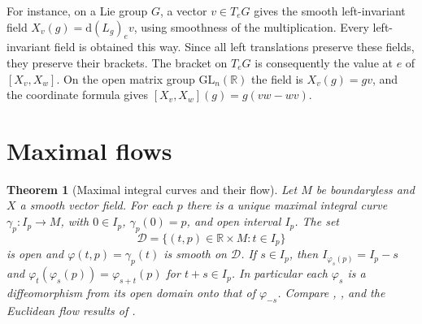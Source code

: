 \documentclass[11pt,oneside,openany]{book}
\newtheorem{theorem}{Theorem}[chapter]
\theoremstyle{definition}
\theoremstyle{remark}
\newcommand{\R}{\mathbb R}
\newcommand{\dd}{\mathrm d}
\begin{document}
For instance, on a Lie group \(G\), a vector \(v\in T_eG\) gives the smooth left-invariant field \(X_v(g)=\dd(L_g)_e v\), using smoothness of the multiplication. Every left-invariant field is obtained this way. Since all left translations preserve these fields, they preserve their brackets. The bracket on \(T_eG\) is consequently the value at \(e\) of \([X_v,X_w]\). On the open matrix group \(\mathrm{GL}_n(\R)\) the field is \(X_v(g)=gv\), and the coordinate formula gives \([X_v,X_w](g)=g(vw-wv)\).

\section{Maximal flows}

\begin{theorem}[Maximal integral curves and their flow]\label{p104:M06.03}
Let \(M\) be boundaryless and \(X\) a smooth vector field. For each \(p\) there is a unique maximal integral curve \(\gamma_p:I_p\to M\), with \(0\in I_p\), \(\gamma_p(0)=p\), and open interval \(I_p\). The set
\[
 \mathcal D=\{(t,p)\in\R\times M:t\in I_p\}
\]
is open and \(\varphi(t,p)=\gamma_p(t)\) is smooth on \(\mathcal D\). If \(s\in I_p\), then \(I_{\varphi_s(p)}=I_p-s\) and \(\varphi_t(\varphi_s(p))=\varphi_{s+t}(p)\) for \(t+s\in I_p\). In particular each \(\varphi_s\) is a diffeomorphism from its open domain onto that of \(\varphi_{-s}\). Compare \cite[Theorems 9.12--9.13 and Appendix D]{lee}, \cite[\S\S14.2--14.3]{tu}, and the Euclidean flow results of \cite[Chapters 6 and 11]{d13}.
\end{theorem}
\end{document}
